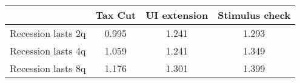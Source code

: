 \begin{tabular}{@{}lccc@{}} 
\toprule 
& Tax Cut    & UI extension    & Stimulus check    \\  \midrule 
Recession lasts 2q &0.995  & 1.241  & 1.293     \\ 
Recession lasts 4q &1.059  & 1.241  & 1.349     \\ 
Recession lasts 8q &1.176  & 1.301  & 1.399     \\ 
\end{tabular}  
